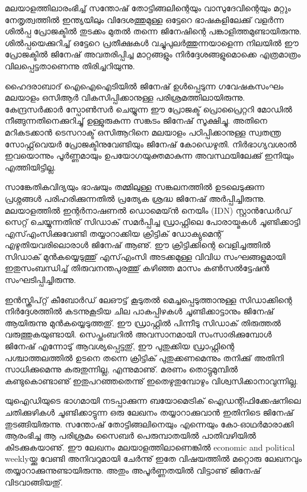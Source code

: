 മലയാളത്തിലാരംഭിച്ച് സന്തോഷ് തോട്ടിങ്ങലിന്റെയും വാസുദേവിന്റെയും മറ്റും നേതൃത്വത്തില്‍ ഇന്ത്യയിലും വിദേശത്തുമുള്ള ഒട്ടേറെ 
ഭാഷകളിലേക്കു് വളര്‍ന്ന ശില്‍പ്പ പ്രോജക്ടില്‍ തുടക്കം മുതല്‍ തന്നെ ജിനേഷിന്റെ പങ്കാളിത്തമുണ്ടായിരുന്നു. ശില്‍പ്പയെക്കുറിച്ച് 
ഒട്ടേറെ പ്രതീക്ഷകള്‍ വച്ചുപുലര്‍ത്തുന്നയാളെന്ന നിലയില്‍ ഈ പ്രോജക്ടില്‍ ജിനേഷ് അവതരിപ്പിച്ച മാറ്റങ്ങളും 
നിര്‍ദ്ദേശങ്ങളുമൊക്കെ എത്രമാത്രം വിലപ്പെട്ടതാണെന്നു തിരിച്ചറിയുന്നു.

ഹൈദരാബാദ് ഐഐഐടിയില്‍ ജിനേഷ് ഉള്‍പ്പെടുന്ന ഗവേഷകസംഘം മലയാളം ഒസിആര്‍ വികസിപ്പിക്കാനുള്ള 
പരിശ്രമത്തിലായിരുന്നു. കേന്ദ്രസര്‍ക്കാര്‍ സ്പോണ്‍സര്‍ ചെയ്യുന്ന ഈ പ്രോജക്ട് പ്രൊപ്രൈറ്ററി മോഡില്‍ നീങ്ങുന്നതിനെക്കുറിച്ചു് 
ഉള്ളുരുകുന്ന സങ്കടം ജിനേഷ് സൂക്ഷിച്ചു. അതിനെ മറികടക്കാന്‍ ടെസറാക്ട് ഒസിആറിനെ മലയാളം പഠിപ്പിക്കാനുള്ള സ്വതന്ത്ര 
സോഫ്റ്റ്‌വെയര്‍ പ്രോജക്ടിനുവേണ്ടിയും ജിനേഷ് കോഡെഴുതി. നിര്‍ഭാഗ്യവശാല്‍ ഇവയൊന്നും പൂര്‍ണ്ണമായും 
ഉപയോഗയുക്തമാകുന്ന അവസ്ഥയിലേക്കു് ഇനിയും എത്തിയിട്ടില്ല.

സാങ്കേതികവിദ്യയും ഭാഷയും തമ്മിലുള്ള സങ്കലനത്തില്‍ ഉടലെടുക്കുന്ന പ്രശ്നങ്ങള്‍ പരിഹരിക്കുന്നതില്‍ പ്രത്യേക ശ്രദ്ധ ജിനേഷ് 
അര്‍പ്പിച്ചിരുന്നു. മലയാളത്തില്‍ ഇന്റര്‍നാഷണല്‍ ഡൊമെയ്ന്‍ നെയിം (IDN) സ്റ്റാന്‍ഡേര്‍ഡ് സെറ്റ് ചെയ്യുന്നതിനു് സിഡാക്‍ 
സമര്‍പ്പിച്ച ഡ്രാഫ്റ്റിലെ പോരായ്മകള്‍ ചൂണ്ടിക്കാട്ടി എസ്എംസിക്കുവേണ്ടി തയ്യാറാക്കിയ ക്രിട്ടിക്‍ ഡോക്യുമെന്റ് 
എഴുതിയവരിലൊരാള്‍ ജിനേഷ് ആണു്. ഈ ക്രിട്ടിക്കിന്റെ വെളിച്ചത്തില്‍ സിഡാക്‍ മുന്‍കയ്യെടുത്തു് എസ്എംസി അടക്കമുള്ള 
വിവിധ സംഘങ്ങളുമായി ഇതുസംബന്ധിച്ച് തിരുവനന്തപുരത്തു് കഴിഞ്ഞ മാസം കണ്‍സല്‍ട്ടേഷന്‍ സംഘടിപ്പിച്ചിരുന്നു.

ഇന്‍സ്ക്രിപ്റ്റ് കീബോര്‍ഡ് ലേഔട്ട് കൂടുതല്‍ മെച്ചപ്പെടുത്താനുള്ള സിഡാക്കിന്റെ നിര്‍ദ്ദേശത്തില്‍ കടന്നുകൂടിയ ചില പാകപ്പിഴകള്‍ 
ചൂണ്ടിക്കാട്ടാനും ജിനേഷ് ആയിരുന്നു മുന്‍കയ്യെടുത്തതു്. ഈ ഡ്രാഫ്റ്റില്‍ പിന്നീടു സിഡാക്‍ തിരുത്തല്‍ വരുത്തുകയുണ്ടായി. 
സെപ്തംബറില്‍ അവസാനമായി സംസാരിക്കുമ്പോള്‍ ജിനേഷ് എന്നോടു് ആവശ്യപ്പെട്ടതു്, ഈ പുതുക്കിയ ഡ്രാഫ്റ്റിന്റെ 
പശ്ചാത്തലത്തില്‍ ഉടനെ തന്നെ ക്രിട്ടിക്‍ പുതുക്കണമെന്നും തനിക്കു് അതിനി സാധിക്കുമെന്നു കരുതുന്നില്ല, എന്നുമാണു്. മരണം 
തൊട്ടുമുമ്പില്‍ കണ്ടുകൊണ്ടാണു് ഇതുപറഞ്ഞതെന്നു് ഇതെഴുതുമ്പോഴും വിശ്വസിക്കാനാവുന്നില്ല.

യുഐഡിയുടെ ഭാഗമായി നടപ്പാക്കുന്ന ബയോമെട്രിക്‍ ഐഡന്റിഫിക്കേഷനിലെ ചതിക്കുഴികള്‍ ചൂണ്ടിക്കാട്ടുന്ന ഒരു ലേഖനം 
തയ്യാറാക്കുവാന്‍ ഇതിനിടെ ജിനേഷ് തുടങ്ങിയിരുന്നു. സന്തോഷ് തോട്ടിങ്ങലിനെയും എന്നെയും കോ-ഓഥര്‍മാരാക്കി ആരംഭിച്ച 
ആ പരിശ്രമം സൈബര്‍ പെരുമ്പാതയില്‍ പാതിവഴിയില്‍ കിടക്കുകയാണു്. ഈ ലേഖനം മലയാളത്തിലാണെങ്കില്‍ 
economic and political weeklyയ്ക്കു വേണ്ടി അനിവറുമായി ചേര്‍ന്നു് ഇതേ വിഷയത്തില്‍ മറ്റൊരു ലേഖനവും 
തയ്യാറാക്കുന്നുണ്ടായിരുന്നു. അതും അപൂര്‍ണ്ണതയില്‍ വിട്ടാണു് ജിനേഷ് വിടവാങ്ങിയതു്.


